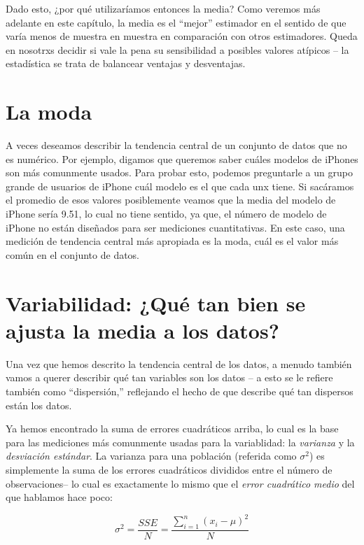 \documentclass[
  12pt,
]{book}
\begin{document}
Dado esto, ¿por qué utilizaríamos entonces la media? Como veremos más adelante en este capítulo, la media es el ``mejor'' estimador en el sentido de que varía menos de muestra en muestra en comparación con otros estimadores. Queda en nosotrxs decidir si vale la pena su sensibilidad a posibles valores atípicos -- la estadística se trata de balancear ventajas y desventajas.

\hypertarget{la-moda}{%
\section{La moda}\label{la-moda}}

A veces deseamos describir la tendencia central de un conjunto de datos que no es numérico. Por ejemplo, digamos que queremos saber cuáles modelos de iPhones son más comunmente usados. Para probar esto, podemos preguntarle a un grupo grande de usuarios de iPhone cuál modelo es el que cada unx tiene. Si sacáramos el promedio de esos valores posiblemente veamos que la media del modelo de iPhone sería 9.51, lo cual no tiene sentido, ya que, el número de modelo de iPhone no están diseñados para ser mediciones cuantitativas. En este caso, una medición de tendencia central más apropiada es la moda, cuál es el valor más común en el conjunto de datos.

\hypertarget{variabilidad-quuxe9-tan-bien-se-ajusta-la-media-a-los-datos}{%
\section{Variabilidad: ¿Qué tan bien se ajusta la media a los datos?}\label{variabilidad-quuxe9-tan-bien-se-ajusta-la-media-a-los-datos}}

Una vez que hemos descrito la tendencia central de los datos, a menudo también vamos a querer describir qué tan variables son los datos -- a esto se le refiere también como ``dispersión,'' reflejando el hecho de que describe qué tan dispersos están los datos.

Ya hemos encontrado la suma de errores cuadráticos arriba, lo cual es la base para las mediciones más comunmente usadas para la variablidad: la \emph{varianza} y la \emph{desviación estándar}. La varianza para una población (referida como \(\sigma^2\)) es simplemente la suma de los errores cuadráticos divididos entre el número de observaciones-- lo cual es exactamente lo mismo que el \emph{error cuadrático medio} del que hablamos hace poco:

\[
\sigma^2 = \frac{SSE}{N} = \frac{\sum_{i=1}^n (x_i - \mu)^2}{N}
\]
\end{document}
